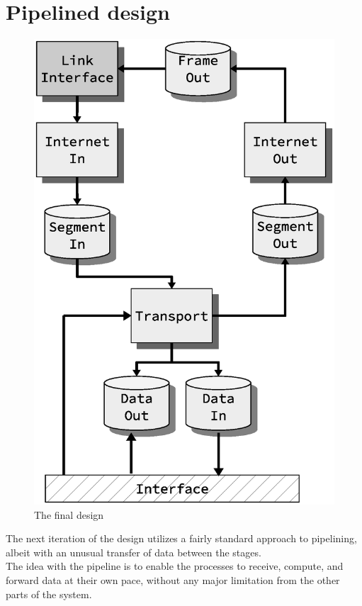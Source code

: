 \section{Pipelined design}
\begin{figure}
    \includegraphics[scale=0.45]{design/design_2.eps}
    \caption{The final design}
    \label{fig:final_design}
\end{figure}

The next iteration of the design utilizes a fairly standard approach to 
pipelining, albeit with an unusual transfer of data between the stages.\\
The idea with the pipeline is to enable the processes to receive, compute, and 
forward data at their own pace, without any major limitation from the other 
parts of the system.


